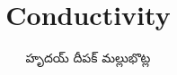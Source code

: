 \documentclass{article}
\title{Conductivity}
\author{\begin{telugu}హృదయ్ దీపక్ మల్లుభొట్ల\end{telugu}}
\date{}
\newcommand{\onlyinsubfile}[1]{#1}
\newcommand{\notinsubfile}[1]{}
\begin{document}
\renewcommand{\onlyinsubfile}[1]{}
\renewcommand{\notinsubfile}[1]{#1}

\maketitle

\tableofcontents




\end{document}
